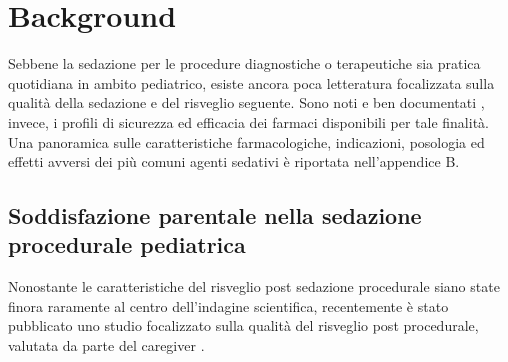 \section{Background}

Sebbene la sedazione per le procedure diagnostiche o terapeutiche sia pratica quotidiana in ambito pediatrico, esiste ancora poca letteratura focalizzata sulla qualità della sedazione e del risveglio seguente. Sono noti e ben documentati \citep{Bellolio2016, Hartlin2016}, invece, i profili di sicurezza ed efficacia dei farmaci disponibili per tale finalità. Una panoramica sulle caratteristiche farmacologiche, indicazioni, posologia ed effetti avversi dei più comuni agenti sedativi è riportata nell'appendice B. %

\bigskip

\subsection*{Soddisfazione parentale nella sedazione procedurale pediatrica}
Nonostante le caratteristiche del risveglio post sedazione procedurale siano state finora raramente al centro dell'indagine scientifica, recentemente è stato pubblicato uno studio focalizzato sulla qualità del risveglio post procedurale, valutata da parte del caregiver \cite{Cortellazzo2022}. %

